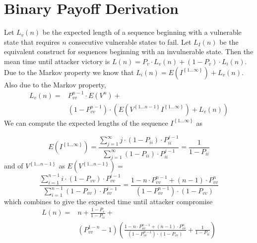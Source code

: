 \documentclass{acm_proc_article-sp}
\begin{document}
\newpage

\appendix
\section{Binary Payoff Derivation}
\label{derivation}
Let $L_{v}\left(n\right)$
be the expected length of a sequence beginning with a vulnerable state
that requires $n$ consecutive vulnerable states to fail. Let $L_{I}\left(n\right)$
be the equivalent construct for sequences beginning with an invulnerable
state. Then the mean time until attacker victory is $L(n)=P_{v}\cdot L_{v}\left(n\right)+\left(1-P_{v}\right)\cdot L_{i}\left(n\right)$.
Due to the Markov property we know that $L_{i}(n)=E\left(I^{\left\{ 1\ldots\infty\right\} }\right)+L_{v}(n)$.
Also due to the Markov property, 
\[
\begin{split}
L_{v}(n)=&P_{vv}^{n-1}\cdot E\left(V^{n}\right)+\\
	& \left(1-P_{vv}^{n-1}\right)\cdot\left(E\left(V^{\left\{ 1\ldots n-1\right\} }I^{\left\{ 1\ldots\infty\right\} }\right)+L_{v}\left(n\right)\right)
\end{split}
\]
We can compute the expected lengths of the sequence $I^{\left\{ 1\ldots\infty\right\} }$
as

\[
E\left(I^{\left\{ 1\ldots\infty\right\} }\right)=\frac{\sum_{j=1}^{\infty}j\cdot\left(1-P_{ii}\right)\cdot P_{ii}^{j-1}}{\sum_{j=1}^{\infty}\left(1-P_{ii}\right)\cdot P_{ii}^{j-1}}=\frac{1}{1-P_{ii}}
\]
and of $V^{\left\{ 1\ldots n-1\right\} }$ as $E\left(V^{\left\{ 1\ldots n-1\right\} }\right)=$
\[
\frac{\sum_{i=1}^{n-1}i\cdot\left(1-P_{vv}\right)\cdot P_{vv}^{i-1}}{\sum_{i=1}^{n-1}\left(1-P_{vv}\right)\cdot P_{vv}^{i-1}}=\frac{1-n\cdot P_{vv}^{n-1}+\left(n-1\right)\cdot P_{vv}^{n}}{\left(1-P_{vv}^{n-1}\right)\cdot\left(1-P_{vv}\right)}
\]
 which combines to give the expected time until attacker compromise
{\small
\[
\begin{split}
L(n)=&n+\frac{1-P_{v}}{1-P_{ii}}+\\
	&\left(P_{vv}^{1-n}-1\right)\left(\frac{1-n\cdot P_{vv}^{n-1}+\left(n-1\right)\cdot P_{vv}^{n}}{\left(1-P_{vv}^{n-1}\right)\cdot\left(1-P_{vv}\right)}+\frac{1}{1-P_{ii}}\right)
\end{split}
\]
}



\end{document}
